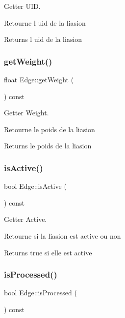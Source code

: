Getter U\+ID. 

Retourne l uid de la liasion

\begin{DoxyReturn}{Returns}
l uid de la liasion 
\end{DoxyReturn}
\mbox{\label{class_edge_a873322923fa6340e17edb39b923f7d61}} 
\subsubsection{\texorpdfstring{get\+Weight()}{getWeight()}}
{\footnotesize\ttfamily float Edge\+::get\+Weight (\begin{DoxyParamCaption}{ }\end{DoxyParamCaption}) const}



Getter Weight. 

Retourne le poids de la liasion

\begin{DoxyReturn}{Returns}
le poids de la liasion 
\end{DoxyReturn}
\mbox{\label{class_edge_a29524dddcadb4eae07997fa8fb6fd76f}} 
\subsubsection{\texorpdfstring{is\+Active()}{isActive()}}
{\footnotesize\ttfamily bool Edge\+::is\+Active (\begin{DoxyParamCaption}{ }\end{DoxyParamCaption}) const}



Getter Active. 

Retourne si la liasion est active ou non

\begin{DoxyReturn}{Returns}
true si elle est active 
\end{DoxyReturn}
\mbox{\label{class_edge_a91b5c22287996d54ae90b1393d11e98c}} 
\subsubsection{\texorpdfstring{is\+Processed()}{isProcessed()}}
{\footnotesize\ttfamily bool Edge\+::is\+Processed (\begin{DoxyParamCaption}{ }\end{DoxyParamCaption}) const}



